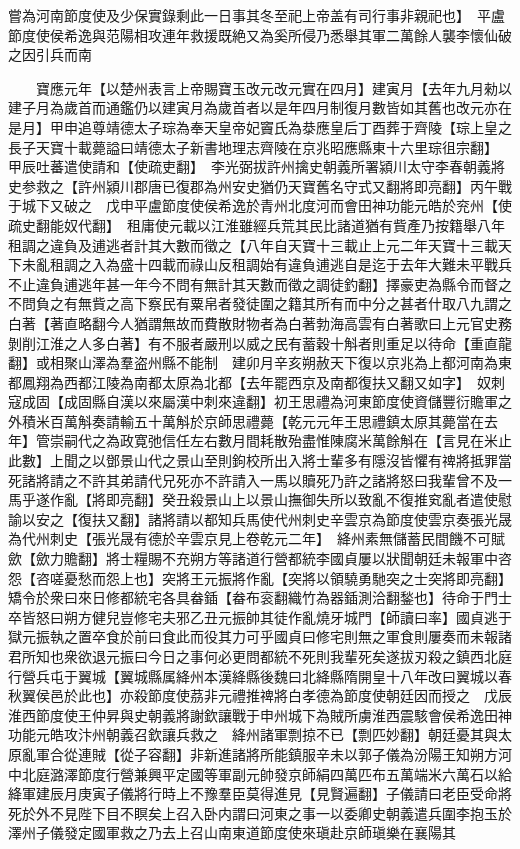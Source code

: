 嘗為河南節度使及少保實錄剩此一日事其冬至祀上帝盖有司行事非親祀也】　平盧節度使侯希逸與范陽相攻連年救援既絶又為奚所侵乃悉舉其軍二萬餘人襲李懷仙破之因引兵而南

　　寶應元年【以楚州表言上帝賜寶玉改元改元實在四月】建寅月【去年九月勑以建子月為歲首而通鑑仍以建寅月為歲首者以是年四月制復月數皆如其舊也改元亦在是月】甲申追尊靖德太子琮為奉天皇帝妃竇氏為㳟應皇后丁酉葬于齊陵【琮上皇之長子天寶十載薨謚曰靖德太子新書地理志齊陵在京兆昭應縣東十六里琮徂宗翻】　甲辰吐蕃遣使請和【使疏吏翻】　李光弼拔許州擒史朝義所署潁川太守李春朝義將史参救之【許州潁川郡唐已復郡為州安史猶仍天寶舊名守式又翻將即亮翻】丙午戰于城下又破之　戊申平盧節度使侯希逸於青州北度河而會田神功能元皓於兖州【使疏史翻能奴代翻】　租庸使元載以江淮雖經兵荒其民比諸道猶有貲產乃按籍舉八年租調之違負及逋逃者計其大數而徵之【八年自天寶十三載止上元二年天寶十三載天下未亂租調之入為盛十四載而祿山反租調始有違負逋逃自是迄于去年大難未平戰兵不止違負逋逃年甚一年今不問有無計其天數而徵之調徒釣翻】擇豪吏為縣令而督之不問負之有無貲之高下察民有粟帛者發徒圍之籍其所有而中分之甚者什取八九謂之白著【著直略翻今人猶謂無故而費散財物者為白著勃海高雲有白著歌曰上元官史務剝削江淮之人多白著】有不服者嚴刑以威之民有蓄穀十斛者則重足以待命【重直龍翻】或相聚山澤為羣盗州縣不能制　建卯月辛亥朔赦天下復以京兆為上都河南為東都鳳翔為西都江陵為南都太原為北都【去年罷西京及南都復扶又翻又如字】　奴刺寇成固【成固縣自漢以來屬漢中刺來違翻】初王思禮為河東節度使資儲豐衍贍軍之外積米百萬斛奏請輸五十萬斛於京師思禮薨【乾元元年王思禮鎮太原其薨當在去年】管崇嗣代之為政寛弛信任左右數月間耗散殆盡惟陳腐米萬餘斛在【言見在米止此數】上聞之以鄧景山代之景山至則鉤校所出入將士輩多有隱沒皆懼有禆將抵罪當死諸將請之不許其弟請代兄死亦不許請入一馬以贖死乃許之諸將怒曰我輩曾不及一馬乎遂作亂【將即亮翻】癸丑殺景山上以景山撫御失所以致亂不復推䆒亂者遣使慰諭以安之【復扶又翻】諸將請以都知兵馬使代州刺史辛雲京為節度使雲京奏張光晟為代州刺史【張光晟有德於辛雲京見上卷乾元二年】　絳州素無儲蓄民間饑不可賦歛【歛力贍翻】將士糧賜不充朔方等諸道行營都統李國貞屢以狀聞朝廷未報軍中咨怨【咨嗟憂愁而怨上也】突將王元振將作亂【突將以領驍勇馳突之士突將即亮翻】矯令於衆曰來日修都統宅各具畚鍤【畚布衮翻織竹為器鍤測洽翻鍫也】待命于門士卒皆怒曰朔方健兒豈修宅夫邪乙丑元振帥其徒作亂燒牙城門【師讀曰率】國貞逃于獄元振執之置卒食於前曰食此而役其力可乎國貞曰修宅則無之軍食則屢奏而未報諸君所知也衆欲退元振曰今日之事何必更問都統不死則我輩死矣遂拔刃殺之鎮西北庭行營兵屯于翼城【翼城縣属絳州本漢絳縣後魏曰北絳縣隋開皇十八年改曰翼城以春秋翼侯邑於此也】亦殺節度使茘非元禮推禆將白孝德為節度使朝廷因而授之　戊辰淮西節度使王仲昇與史朝義將謝欽讓戰于申州城下為賊所虜淮西震駭會侯希逸田神功能元皓攻汴州朝義召欽讓兵救之　絳州諸軍剽掠不已【剽匹妙翻】朝廷憂其與太原亂軍合從連賊【從子容翻】非新進諸將所能鎮服辛未以郭子儀為汾陽王知朔方河中北庭潞澤節度行營兼興平定國等軍副元帥發京師絹四萬匹布五萬端米六萬石以給絳軍建辰月庚寅子儀將行時上不豫羣臣莫得進見【見賢遍翻】子儀請曰老臣受命將死於外不見陛下目不瞑矣上召入卧内謂曰河東之事一以委卿史朝義遣兵圍李抱玉於澤州子儀發定國軍救之乃去上召山南東道節度使來瑱赴京師瑱樂在襄陽其

